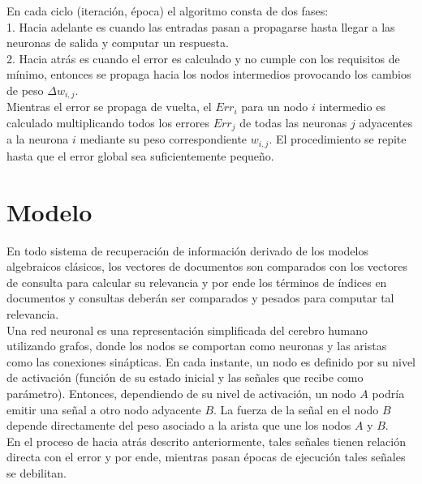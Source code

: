 \documentclass{llncs}
\begin{document}
{En cada ciclo (iteraci\'on, \'epoca) el algoritmo consta de dos fases:\\

1. Hacia adelante es cuando las entradas pasan a propagarse hasta llegar a las neuronas de salida y computar un respuesta. \\

2. Hacia atr\'as es cuando el error es calculado y no cumple con los requisitos de m\'inimo, entonces se propaga hacia los nodos intermedios provocando los cambios
de peso $\Delta w_{i,j}.$\\

Mientras el error se propaga de vuelta, el $Err_i$ para un nodo $i$ intermedio es calculado multiplicando todos los errores $Err_j$ de todas las neuronas $j$ adyacentes
a la neurona $i$ mediante su peso correspondiente $w_{i,j}$. El procedimiento se repite hasta que el error global sea suficientemente peque\~no. \\

\section{Modelo}

En todo sistema de recuperaci\'on de informaci\'on derivado de los modelos algebraicos cl\'asicos, los vectores de documentos son comparados con los vectores de consulta
para calcular su relevancia y por ende los t\'erminos de \'indices en documentos y consultas deber\'an ser comparados y pesados para computar tal relevancia. \\


Una red neuronal es una representaci\'on simplificada del cerebro humano utilizando grafos, donde los nodos se comportan como neuronas y las aristas como las
conexiones sin\'apticas. En cada instante, un nodo es definido por su nivel de activaci\'on (funci\'on de su estado inicial y las se\~nales que recibe como par\'ametro).
Entonces, dependiendo de su nivel de activaci\'on, un nodo $A$ podr\'ia emitir una se\~nal a otro nodo adyacente $B$. La fuerza de la se\~nal en el nodo $B$
depende directamente del peso asociado a la arista que une los nodos $A$ y $B$.\\

En el proceso de hacia atr\'as descrito anteriormente, tales se\~nales tienen relaci\'on directa con el error y por ende, mientras pasan \'epocas de ejecuci\'on tales
se\~nales se debilitan.\\

}
\end{document}
